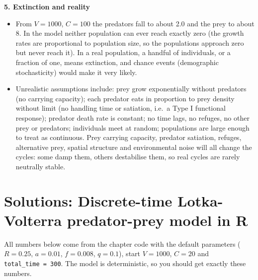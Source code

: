 \documentclass[
  a4paper]{book}
\providecommand{\tightlist}{%
  \setlength{\itemsep}{0pt}\setlength{\parskip}{0pt}}
\begin{document}
\textbf{5. Extinction and reality}

\begin{itemize}
\tightlist
\item
  From \(V = 1000\), \(C = 100\) the predators fall to about 2.0 and the prey to about 8. In the model neither population can ever reach exactly zero (the growth rates are proportional to population size, so the populations approach zero but never reach it). In a real population, a handful of individuals, or a fraction of one, means extinction, and chance events (demographic stochasticity) would make it very likely.
\item
  Unrealistic assumptions include: prey grow exponentially without predators (no carrying capacity); each predator eats in proportion to prey density without limit (no handling time or satiation, i.e.~a Type I functional response); predator death rate is constant; no time lags, no refuges, no other prey or predators; individuals meet at random; populations are large enough to treat as continuous. Prey carrying capacity, predator satiation, refuges, alternative prey, spatial structure and environmental noise will all change the cycles: some damp them, others destabilise them, so real cycles are rarely neutrally stable.
\end{itemize}

\section{Solutions: Discrete-time Lotka-Volterra predator-prey model in R}\label{solutions-discrete-time-lotka-volterra-predator-prey-model-in-r}

All numbers below come from the chapter code with the default parameters (\(R = 0.25\), \(a = 0.01\), \(f = 0.008\), \(q = 0.1\)), start \(V = 1000\), \(C = 20\) and \texttt{total\_time\ =\ 300}. The model is deterministic, so you should get exactly these numbers.
\end{document}
